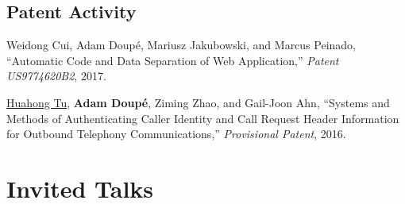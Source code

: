 \documentclass[11pt,letterpaper,sans]{moderncv}
\begin{document}
\subsection{Patent Activity}

\begin{etaremune}

  \item Weidong Cui, Adam Doup\'e, Mariusz Jakubowski, and Marcus
    Peinado, ``Automatic Code and Data Separation of Web
    Application,'' \emph{Patent US9774620B2}, 2017. 

  \item \underline{Huahong Tu}, \textbf{Adam Doup\'e}, Ziming Zhao,
    and Gail-Joon Ahn, ``Systems and Methods of Authenticating Caller
    Identity and Call Request Header Information for Outbound
    Telephony Communications,'' \emph{Provisional Patent}, 2016.

  
\end{etaremune}

\section{Invited Talks}
\end{document}

